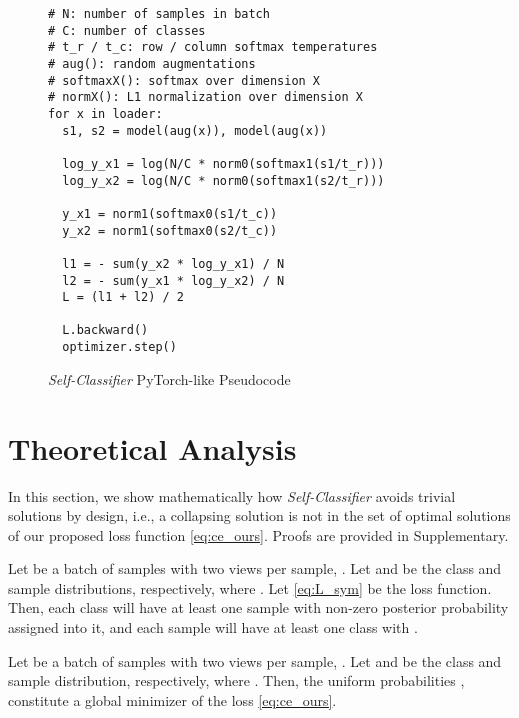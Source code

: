 \documentclass[runningheads]{llncs}
\begin{document}
\begin{figure}[ht]
\centering
\begin{minipage}{.87\linewidth}
    \begin{algorithm}[H]
        \caption{{\it Self-Classifier} PyTorch-like Pseudocode}
        \begin{lstlisting}
# N: number of samples in batch
# C: number of classes
# t_r / t_c: row / column softmax temperatures
# aug(): random augmentations
# softmaxX(): softmax over dimension X
# normX(): L1 normalization over dimension X
for x in loader:
  s1, s2 = model(aug(x)), model(aug(x))

  log_y_x1 = log(N/C * norm0(softmax1(s1/t_r)))
  log_y_x2 = log(N/C * norm0(softmax1(s2/t_r)))

  y_x1 = norm1(softmax0(s1/t_c))
  y_x2 = norm1(softmax0(s2/t_c))

  l1 = - sum(y_x2 * log_y_x1) / N
  l2 = - sum(y_x1 * log_y_x2) / N
  L = (l1 + l2) / 2

  L.backward()
  optimizer.step()    
        \end{lstlisting}
        \label{algo:pseudo_code}
    \end{algorithm}
\end{minipage}
\end{figure}

\section{Theoretical Analysis}
\label{section:theoretical}
In this section, we show mathematically how \textit{Self-Classifier} avoids trivial solutions by design, i.e., a collapsing solution is not in the set of optimal solutions of our proposed loss function \cref{eq:ce_ours}. Proofs are provided in Supplementary.

\begin{theorem}
\label{theorem:non_zero_prob}
Let  be a batch of  samples with two views per sample, . Let  and  be the class and sample distributions, respectively, where . Let \cref{eq:L_sym} be the loss function. Then, each class  will have at least one sample  with non-zero posterior probability  assigned into it, and each sample  will have at least one class   with .
\end{theorem}

\begin{theorem}
\label{theorem:custom_optimal_sol}
Let  be a batch of  samples with two views per sample, . Let  and  be the class and sample distribution, respectively, where . Then, the uniform probabilities ,  constitute a global minimizer of the loss \cref{eq:ce_ours}.
\end{theorem}
\end{document}
